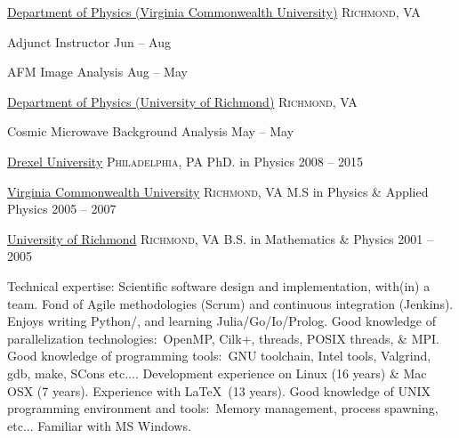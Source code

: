 \documentclass[10pt,a4paper]{article}
\begin{document}
\headedsection
  {\href{https://physics.vcu.edu/}{Department of Physics (Virginia Commonwealth University)}}
  {\textsc{Richmond, VA}} {%

  \headedsubsection
    {Adjunct Instructor}
    {Jun  -- Aug }
    {}

  \headedsubsection
    {AFM Image Analysis}
    {Aug  -- May }
    {}
}

\headedsection  %
  {\href{http://physics.richmond.edu/}{Department of Physics (University of Richmond)}}
  {\textsc{Richmond, VA}} {%

  \headedsubsection
    {Cosmic Microwave Background Analysis}
    {May  -- May }
    {}
}


\spacedhrule{0.4em}{-0.4em}



\headedsection
  {\href{http://drexel.edu/}{Drexel University}}
  {\textsc{Philadelphia, PA}} {%
  \headedsubsection
    {PhD. in Physics}
    {2008 -- 2015}
    {}
}

\headedsection
  {\href{http://www.vcu.edu/}{Virginia Commonwealth University}}
  {\textsc{Richmond, VA}} {%
  \headedsubsection
    {M.S in Physics \& Applied Physics}
    {2005 -- 2007}
    {}
}

\headedsection
  {\href{http://www.richmond.edu/}{University of Richmond}}
  {\textsc{Richmond, VA}} {%
  \headedsubsection
    {B.S. in Mathematics \& Physics}
    {2001 -- 2005}
    {}
}


\spacedhrule{0.5em}{-0.4em}


\inlineheadsection  %
  {Technical expertise:}
  {Scientific software design and implementation, with(in) a team.  Fond of Agile methodologies (Scrum) and continuous integration (Jenkins).  Enjoys writing Python/\nsp \CPP, and learning Julia/\nsp Go/\nsp Io/\nsp Prolog.  Good knowledge of parallelization technologies:\ OpenMP, Cilk+,  threads, POSIX threads, \& MPI.  Good knowledge of programming tools:\ GNU toolchain, Intel tools, Valgrind, gdb, make, SCons etc.... Development experience on Linux (16 years) \& Mac OSX (7 years). Experience with \LaTeX \ (13 years). Good knowledge of UNIX programming environment and tools:\ Memory management, process spawning, etc... Familiar with MS Windows.}
\end{document}
